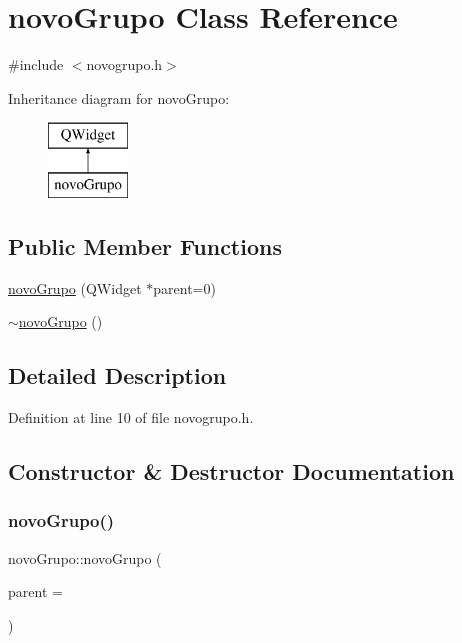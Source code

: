 \hypertarget{classnovo_grupo}{}\section{novo\+Grupo Class Reference}
\label{classnovo_grupo}


{\ttfamily \#include $<$novogrupo.\+h$>$}

Inheritance diagram for novo\+Grupo\+:\begin{figure}[H]
\begin{center}
\leavevmode
\includegraphics[height=2.000000cm]{classnovo_grupo}
\end{center}
\end{figure}
\subsection*{Public Member Functions}
\begin{DoxyCompactItemize}
\item 
\hyperlink{classnovo_grupo_a2e343a019db9fe74eea1809e833a8517}{novo\+Grupo} (Q\+Widget $\ast$parent=0)
\item 
\hyperlink{classnovo_grupo_a561957c27e43bc56cc595a37db18aa33}{$\sim$novo\+Grupo} ()
\end{DoxyCompactItemize}


\subsection{Detailed Description}


Definition at line 10 of file novogrupo.\+h.



\subsection{Constructor \& Destructor Documentation}
\hypertarget{classnovo_grupo_a2e343a019db9fe74eea1809e833a8517}{}\label{classnovo_grupo_a2e343a019db9fe74eea1809e833a8517} 
\subsubsection{\texorpdfstring{novo\+Grupo()}{novoGrupo()}}
{\footnotesize\ttfamily novo\+Grupo\+::novo\+Grupo (\begin{DoxyParamCaption}\item[{Q\+Widget $\ast$}]{parent = {} }\end{DoxyParamCaption})\hspace{0.3cm}{\ttfamily [explicit]}}



